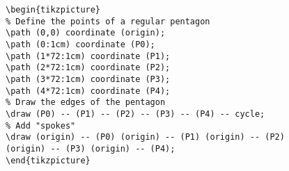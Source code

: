 
%
%
%
%

\bgroup
\egroup
%

%

\begin{verbatim}
\begin{tikzpicture}
% Define the points of a regular pentagon
\path (0,0) coordinate (origin);
\path (0:1cm) coordinate (P0);
\path (1*72:1cm) coordinate (P1);
\path (2*72:1cm) coordinate (P2);
\path (3*72:1cm) coordinate (P3);
\path (4*72:1cm) coordinate (P4);
% Draw the edges of the pentagon
\draw (P0) -- (P1) -- (P2) -- (P3) -- (P4) -- cycle;
% Add "spokes"
\draw (origin) -- (P0) (origin) -- (P1) (origin) -- (P2)
(origin) -- (P3) (origin) -- (P4);
\end{tikzpicture}
\end{verbatim}






